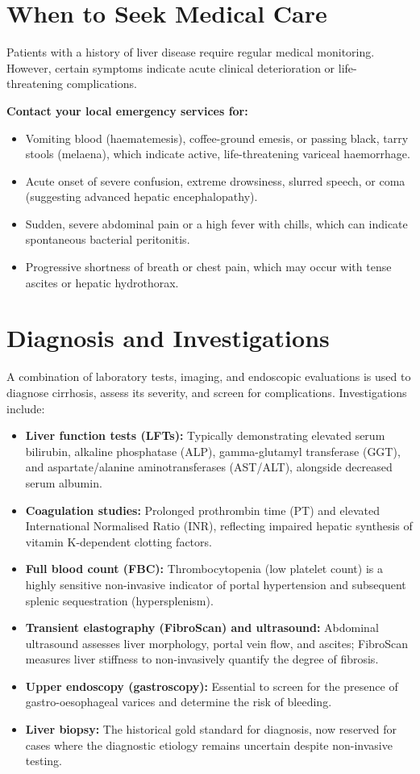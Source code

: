 \section*{When to Seek Medical Care}
Patients with a history of liver disease require regular medical monitoring. However, certain symptoms indicate acute clinical deterioration or life-threatening complications.

\textbf{Contact your local emergency services for:}
\begin{itemize}
    \item Vomiting blood (haematemesis), coffee-ground emesis, or passing black, tarry stools (melaena), which indicate active, life-threatening variceal haemorrhage.
    \item Acute onset of severe confusion, extreme drowsiness, slurred speech, or coma (suggesting advanced hepatic encephalopathy).
    \item Sudden, severe abdominal pain or a high fever with chills, which can indicate spontaneous bacterial peritonitis.
    \item Progressive shortness of breath or chest pain, which may occur with tense ascites or hepatic hydrothorax.
\end{itemize}

\section*{Diagnosis and Investigations}
A combination of laboratory tests, imaging, and endoscopic evaluations is used to diagnose cirrhosis, assess its severity, and screen for complications. Investigations include:

\begin{itemize}
    \item \textbf{Liver function tests (LFTs):} Typically demonstrating elevated serum bilirubin, alkaline phosphatase (ALP), gamma-glutamyl transferase (GGT), and aspartate/alanine aminotransferases (AST/ALT), alongside decreased serum albumin.
    \item \textbf{Coagulation studies:} Prolonged prothrombin time (PT) and elevated International Normalised Ratio (INR), reflecting impaired hepatic synthesis of vitamin K-dependent clotting factors.
    \item \textbf{Full blood count (FBC):} Thrombocytopenia (low platelet count) is a highly sensitive non-invasive indicator of portal hypertension and subsequent splenic sequestration (hypersplenism).
    \item \textbf{Transient elastography (FibroScan) and ultrasound:} Abdominal ultrasound assesses liver morphology, portal vein flow, and ascites; FibroScan measures liver stiffness to non-invasively quantify the degree of fibrosis.
    \item \textbf{Upper endoscopy (gastroscopy):} Essential to screen for the presence of gastro-oesophageal varices and determine the risk of bleeding.
    \item \textbf{Liver biopsy:} The historical gold standard for diagnosis, now reserved for cases where the diagnostic etiology remains uncertain despite non-invasive testing.
\end{itemize}

